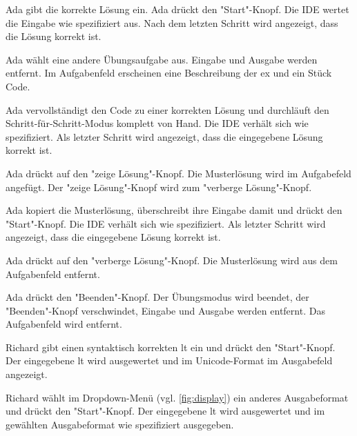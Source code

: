 \documentclass[parskip=full,11pt,twoside]{scrartcl}
\begin{document}
{Ada gibt die korrekte Lösung ein. Ada drückt den "Start"-Knopf.}
{Die IDE wertet die Eingabe wie spezifiziert aus.
 Nach dem letzten Schritt wird angezeigt, dass die Lösung korrekt ist.}
 
{Ada wählt eine andere Übungsaufgabe aus.}
{Eingabe und Ausgabe werden entfernt.
Im Aufgabenfeld erscheinen eine Beschreibung der \gls{ex} und ein Stück Code.}

{Ada vervollständigt den Code zu einer korrekten Lösung und durchläuft den Schritt-für-Schritt-Modus komplett von Hand.}
{Die IDE verhält sich wie spezifiziert.
 Als letzter Schritt wird angezeigt, dass die eingegebene Lösung korrekt ist.}

{Ada drückt auf den "zeige Lösung"-Knopf.}
{Die Musterlösung wird im Aufgabefeld angefügt.
 Der "zeige Lösung"-Knopf wird zum "verberge Lösung"-Knopf.}

{Ada kopiert die Musterlösung, überschreibt ihre Eingabe damit und drückt den "Start"-Knopf.}
{Die IDE verhält sich wie spezifiziert. 
 Als letzter Schritt wird angezeigt, dass die eingegebene Lösung korrekt ist.}
 
{Ada drückt auf den "verberge Lösung"-Knopf.}
{Die Musterlösung wird aus dem Aufgabenfeld entfernt.}
 
{Ada drückt den "Beenden"-Knopf.}
{Der Übungsmodus wird beendet, der "Beenden"-Knopf verschwindet, Eingabe und Ausgabe werden entfernt.
 Das Aufgabenfeld wird entfernt.}


{Richard gibt einen syntaktisch korrekten \gls{lt} ein und drückt den "Start"-Knopf.}
{Der eingegebene \gls{lt} wird ausgewertet und im Unicode-Format im Ausgabefeld angezeigt.}

{Richard wählt im Dropdown-Menü (vgl. \cref{fig:display}) ein anderes Ausgabeformat und drückt den "Start"-Knopf.}
{Der eingegebene \gls{lt} wird ausgewertet und im gewählten Ausgabeformat wie spezifiziert ausgegeben.}
\end{document}
